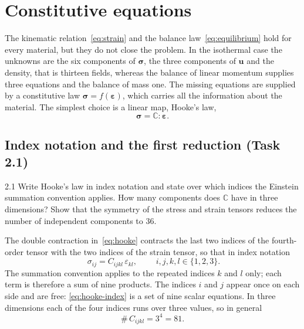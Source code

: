 \documentclass[11pt,a4paper]{article}
\numberwithin{equation}{section}
\theoremstyle{remark}
\newcommand{\bu}{\bm{u}}
\newcommand{\bsig}{\bm{\sigma}}
\newcommand{\beps}{\bm{\varepsilon}}
\newcommand{\CC}{\mathbb{C}}
\begin{document}
\section{Constitutive equations}\label{sec:constitutive}

The kinematic relation~\eqref{eq:strain} and the balance law~\eqref{eq:equilibrium} hold
for every material, but they do not close the problem. In the isothermal case the unknowns
are the six components of $\bsig$, the three components of $\bu$ and the density, that is
thirteen fields, whereas the balance of linear momentum supplies three equations and the
balance of mass one. The missing equations are supplied by a constitutive law
$\bsig = f(\beps)$, which carries all the information about the material. The simplest
choice is a linear map, Hooke's law,
\begin{equation}\label{eq:hooke}
  \bsig = \CC : \beps.
\end{equation}

\subsection{Index notation and the first reduction (Task 2.1)}\label{sec:indexnotation}

\begin{task}{2.1}
  Write Hooke's law in index notation and state over which indices the Einstein summation
  convention applies. How many components does $\CC$ have in three dimensions? Show that
  the symmetry of the stress and strain tensors reduces the number of independent
  components to $36$.
\end{task}

The double contraction in~\eqref{eq:hooke} contracts the last two indices of the
fourth-order tensor with the two indices of the strain tensor, so that in index notation
\begin{equation}\label{eq:hooke-index}
  \boxed{\;\sigma_{ij} = C_{ijkl}\,\varepsilon_{kl},\;}
  \qquad i,j,k,l \in \{1,2,3\}.
\end{equation}
The summation convention applies to the repeated indices $k$ and $l$ only; each term is
therefore a sum of nine products. The indices $i$ and $j$ appear once on each side and are
free: \eqref{eq:hooke-index} is a set of nine scalar equations. In three dimensions each
of the four indices runs over three values, so in general
\begin{equation}\label{eq:81}
  \#\,C_{ijkl} = 3^4 = 81.
\end{equation}
\end{document}

